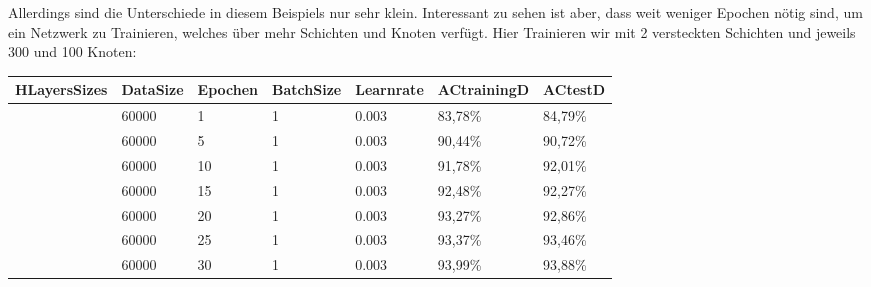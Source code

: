\documentclass[12pt]{article}
\begin{document}
	Allerdings sind die Unterschiede in diesem Beispiels nur sehr klein. Interessant zu sehen ist aber, dass weit weniger Epochen nötig sind, um ein Netzwerk zu Trainieren, welches über mehr Schichten und Knoten verfügt. Hier Trainieren wir mit 2 versteckten Schichten und jeweils 300 und 100 Knoten:
\begin{table}[H]
    \centering
    \begin{tabular}{|l|l|l|l|l|l|l|}
    \hline
        HLayersSizes & DataSize & Epochen & BatchSize & Learnrate & ACtrainingD & ACtestD \\ \hline
        [784, 300, 100, 10] & 60000 & 1 & 1 & 0.003 & 83,78\% & 84,79\% \\ \hline
        [784, 300, 100, 10] & 60000 & 5 & 1 & 0.003 & 90,44\% & 90,72\% \\ \hline
        [784, 300, 100, 10] & 60000 & 10 & 1 & 0.003 & 91,78\% & 92,01\% \\ \hline
        [784, 300, 100, 10] & 60000 & 15 & 1 & 0.003 & 92,48\% & 92,27\% \\ \hline
        [784, 300, 100, 10] & 60000 & 20 & 1 & 0.003 & 93,27\% & 92,86\% \\ \hline
        [784, 300, 100, 10] & 60000 & 25 & 1 & 0.003 & 93,37\% & 93,46\% \\ \hline
        [784, 300, 100, 10] & 60000 & 30 & 1 & 0.003 & 93,99\% & 93,88\% \\ \hline
    \end{tabular}
\end{table}
\end{document}
